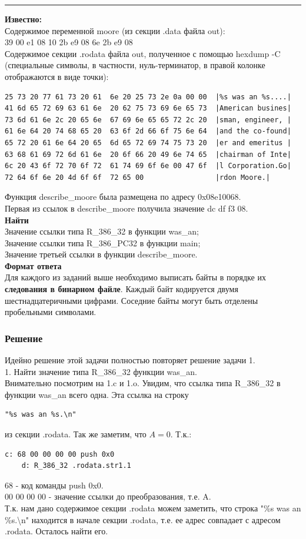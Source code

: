 \documentclass[12pt, letterpaper]{article}
\begin{document}
\hrule
\textbf{Известно:}\\
Содержимое переменной moore (из секции .data файла out):\\
39 00 e1 08 10 2b e9 08 6e 2b e9 08\\
Содержимое секции .rodata файла out, полученное с помощью hexdump -C (специальные символы, в частности, нуль-терминатор, в правой колонке отображаются в виде точки):\\
\begin{verbatim}
25 73 20 77 61 73 20 61  6e 20 25 73 2e 0a 00 00  |%s was an %s....|
41 6d 65 72 69 63 61 6e  20 62 75 73 69 6e 65 73  |American busines|
73 6d 61 6e 2c 20 65 6e  67 69 6e 65 65 72 2c 20  |sman, engineer, |
61 6e 64 20 74 68 65 20  63 6f 2d 66 6f 75 6e 64  |and the co-found|
65 72 20 61 6e 64 20 65  6d 65 72 69 74 75 73 20  |er and emeritus |
63 68 61 69 72 6d 61 6e  20 6f 66 20 49 6e 74 65  |chairman of Inte|
6c 20 43 6f 72 70 6f 72  61 74 69 6f 6e 00 47 6f  |l Corporation.Go|
72 64 6f 6e 20 4d 6f 6f  72 65 00                 |rdon Moore.|
\end{verbatim}
Функция describe\_moore была размещена по адресу 0x08e10068.\\
Первая из ссылок в describe\_moore получила значение dc df f3 08.\\
\textbf{Найти}\\
Значение ссылки типа R\_386\_32 в функции was\_an;\\
Значение ссылки типа R\_386\_PC32 в функции main;\\
Значение третьей ссылки в функции describe\_moore.\\
\textbf{Формат ответа}\\
Для каждого из заданий выше необходимо выписать байты в порядке их \textbf{следования в бинарном файле}. Каждый байт кодируется двумя шестнадцатеричными цифрами. Соседние байты могут быть отделены пробельными символами.
\newpage
\subsubsection{Решение}
Идейно решение этой задачи полностью повторяет решение задачи 1.\\

1. Найти значение типа R\_386\_32 функции was\_an.\\
Внимательно посмотрим на 1.c и 1.o. Увидим, что ссылка типа R\_386\_32 в функции was\_an всего одна. Эта ссылка на строку 
\begin{verbatim}
"%s was an %s.\n" 
\end{verbatim}
из секции .rodata. Так же заметим, что $A=0$. Т.к.:
\begin{verbatim}
c: 68 00 00 00 00 push 0x0
    d: R_386_32 .rodata.str1.1
\end{verbatim}
68 - код команды push 0x0.\\ 00 00 00 00 - значение ссылки до преобразования, т.е. A.\\
Т.к. нам дано содержимое секции .rodata можем заметить, что строка "\%s was an \%s.\textbackslash n" находится в начале секции .rodata, т.е. ее адрес совпадает с адресом .rodata. Осталось найти его.\\
\end{document}
